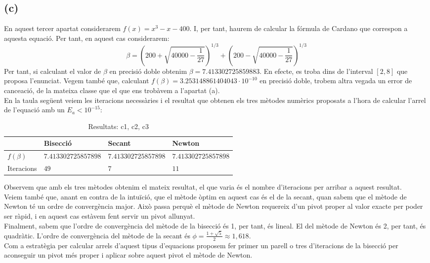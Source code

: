 \documentclass[11pt]{article}
\begin{document}
	\subsection*{(c)}
	En aquest tercer apartat considerarem $f(x) = x^3 - x - 400$. I, per tant, haurem de calcular la fórmula de Cardano que correspon a aquesta equació. Per tant, en aquest cas considerarem: \footnotemark
	\begin{equation*}
		\beta = \left( 200 + \sqrt{40000 - \frac{1}{27}} \right)^{1/3} + \left( 200-\sqrt{40000-\frac{1}{27}} \right)^{1/3} 
	\end{equation*}
	Per tant, si calculant el valor de $\beta$ en precisió doble obtenim $\beta = 7.413302725859883$. En efecte, es troba dins de l'interval $[2,8]$ que proposa l'enunciat. Vegem també que, calculant $f(\beta) = 3.253148861404043 \cdot 10^{-10}$ en precisió doble, trobem altra vegada un error de cance\lgem ació, de la mateixa classe que el que ens trobàvem a l'apartat (a).\\
	En la taula següent veiem les iteracions necessàries i el resultat que obtenen els tres mètodes numèrics proposats a l'hora de calcular l'arrel de l'equació amb un $E_a < 10^{-15}$:
	\begin{table}[H]
		\begin{center}
			\begin{tabular}[c]{|p{15mm}|p{32mm}|p{32mm}|p{32mm}|}
			\hline 
			& Bisecció & Secant & Newton \\ 
			\hline 
			$f(\beta)$ 
			& 
			$7.413302725857898$
			& 
			$7.413302725857898$ 
			&
			$7.413302725857898$
			\\
			\hline
			Iteracions
			&
			$49$ & $7$ & $11$ \\
			\hline
			\end{tabular}
		\caption{Resultats: c1, c2, c3}
		\end{center}
	\end{table}
	Observem que amb els tres mètodes obtenim el mateix resultat, el que varia és el nombre d'iteracions per arribar a aquest resultat.\\
	Veiem també que, anant en contra de la intuïció, que el mètode òptim en aquest cas és el de la secant, quan sabem que el mètode de Newton té un ordre de convergència major. Això passa perquè el mètode de Newton requereix d'un pivot proper al valor exacte per poder ser ràpid, i en aquest cas estàvem fent servir un pivot allunyat.\\
	Finalment, sabem que l'ordre de convergència del mètode de la bisecció és 1, per tant, és lineal. El del mètode de Newton és 2, per tant, és quadràtic. L'ordre de convergència del mètode de la secant és $\phi = \frac{1 + \sqrt{5}}{2} \approx 1,618$.\\
	Com a estratègia per calcular arrels d'aquest tipus d'equacions proposem fer primer un parell o tres d'iteracions de la bisecció per aconseguir un pivot més proper i aplicar sobre aquest pivot el mètode de Newton.
	\newpage
\end{document}
